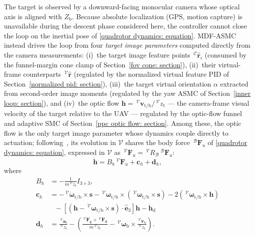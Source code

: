 The target is observed by a downward-facing monocular camera whose optical axis is aligned with $Z_\text{b}$. Because absolute localization (GPS, motion capture) is unavailable during the descent phase considered here, the controller cannot close the loop on the inertial pose of \eqref{quadrotor dynamics: equation}. MDF-ASMC instead drives the loop from four \emph{target image parameters} computed directly from the camera measurements: (i)~the target image feature points $\,^\mathcal{C}\boldsymbol{\hat{r}}_i$ (consumed by the funnel-margin cone clamp of Section~\ref{fov cone: section}), (ii)~their virtual-frame counterparts $\,^\mathcal{V}\boldsymbol{\hat{r}}$ (regulated by the normalized virtual feature PID of Section~\ref{normalized pid: section}), (iii)~the target virtual orientation $\alpha$ extracted from second-order image moments (regulated by the yaw ASMC of Section~\ref{inner loop: section}), and (iv)~the optic flow $\boldsymbol{h}=\,^\mathcal{V}\boldsymbol{v}_{\text{t/b}}/\,^\mathcal{V}z_\text{t}$ --- the camera-frame visual velocity of the target relative to the UAV --- regulated by the optic-flow funnel and adaptive SMC of Section~\ref{ppc optic flow: section}. Among these, the optic flow is the only target image parameter whose dynamics couple directly to actuation; following~\cite{herisse2012}, its evolution in $\mathcal{V}$ shares the body force $\,^\mathcal{B}\boldsymbol{F}_u$ of \eqref{quadrotor dynamics: equation}, expressed in $\mathcal{V}$ as $\,^\mathcal{V}\boldsymbol{F}_u=\,^\mathcal{V}R_\mathcal{B}\,^\mathcal{B}\boldsymbol{F}_u$:
\begin{equation}
    \dot{\boldsymbol{h}} = B_h \,^\mathcal{V} \boldsymbol{F}_u + \boldsymbol{c}_h + \boldsymbol{d}_h,
\end{equation}
where 
\begin{align*}
    B_h &= - \frac{1}{m \,^\mathcal{V} z_{\text{t}}} I_{3 \times 3}, \\
    \boldsymbol{c}_h &=  - \,^\mathcal{V}\dot{\boldsymbol{\omega}}_{\text{t/b}} \times \boldsymbol{s} - \,^\mathcal{V}\boldsymbol{\omega}_{\text{t/b}} \times \left(\,^\mathcal{V} \boldsymbol{\omega}_{\text{t/b}} \times \boldsymbol{s} \right) - 2 \left(\,^\mathcal{V} \boldsymbol{\omega}_{\text{t/b}} \times \boldsymbol{h} \right) \nonumber \\
    &~~~ - \left[\left( \boldsymbol{h} - \,^\mathcal{V}\boldsymbol{\omega}_{\text{t/b}} \times \boldsymbol{s} \right) \cdot \hat{\boldsymbol{e}}_3 \right] \boldsymbol{h} - \dot{\boldsymbol{h}}_\text{d} \\
    \boldsymbol{d}_h &= \frac{\,^\mathcal{V}\boldsymbol{a}_{\text{t}}}{\,^\mathcal{V}z_{\text{t}}} - \left(\frac{\,^\mathcal{V}\boldsymbol{F_{\text{g}}} + \,^\mathcal{V}\boldsymbol{F_{\text{d}}}}{m \,^\mathcal{V}z_{\text{t}}} - \,^\mathcal{V}\boldsymbol{\omega}_{\text{b}} \times \frac{\,^\mathcal{V}\boldsymbol{v}_{\text{b}}}{\,^\mathcal{V}z_{\text{t}}} \right).
\end{align*}
